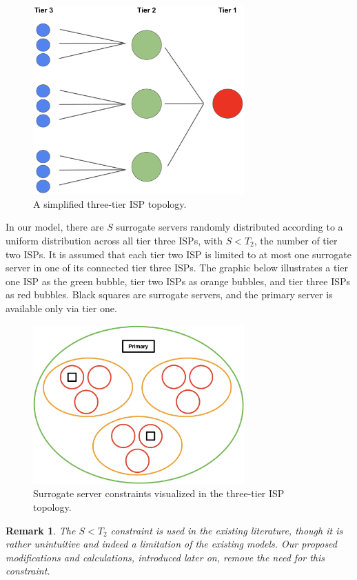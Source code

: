 \documentclass[
	a4paper, %
	10pt, %
	unnumberedsections, %
	twoside, %
]{LTJournalArticle}
\newtheorem*{remark}{Remark}
\begin{document}
\begin{figure}[h]
	\begin{center}
		\includegraphics[width=8.1cm]{tier-2.png}
	\end{center}
	\caption{A simplified three-tier ISP topology.}	
\end{figure}

In our model, there are $S$ surrogate servers randomly distributed according to a uniform distribution across all tier three ISPs, with $S < T_2$, the number of tier two ISPs. It is assumed that each tier two ISP is limited to at most one surrogate server in one of its connected tier three ISPs. The graphic below illustrates a tier one ISP as the green bubble, tier two ISPs as orange bubbles, and tier three ISPs as red bubbles. Black squares are surrogate servers, and the primary server is available only via tier one.

\begin{figure}[h]
	\begin{center}
		\includegraphics[width=8.1cm]{bubble.jpeg}
	\end{center}
	\caption{Surrogate server constraints visualized in the three-tier ISP topology.}	
\end{figure}
\begin{remark}
The $S < T_2$ constraint is used in the existing literature, though it is rather unintuitive and indeed a limitation of the existing models. Our proposed modifications and calculations, introduced later on, remove the need for this constraint.
\end{remark}
\end{document}
